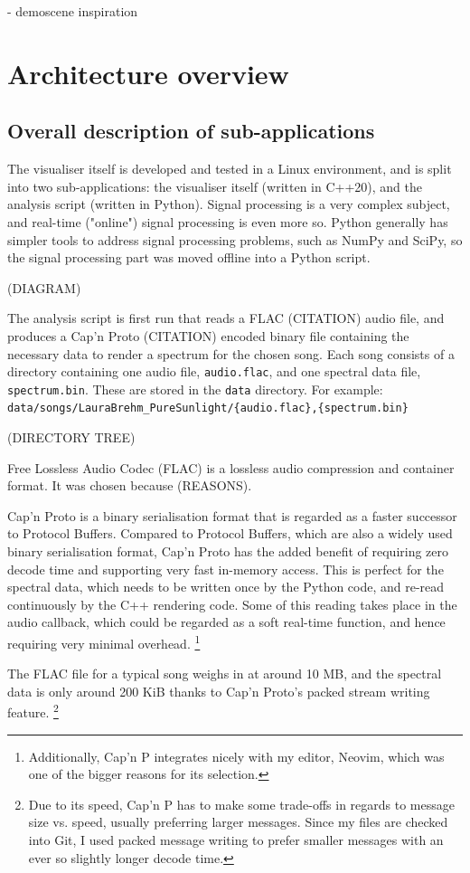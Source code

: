 \documentclass[11pt]{article}
\begin{document}
- demoscene inspiration

\section{Architecture overview}
\subsection{Overall description of sub-applications}
The visualiser itself is developed and tested in a Linux environment, and is split into two sub-applications:
the visualiser itself (written in C++20), and the analysis script (written in Python). Signal processing is a
very complex subject, and real-time ("online") signal processing is even more so. Python generally has simpler
tools to address signal processing problems, such as NumPy and SciPy, so the signal processing part was moved
offline into a Python script.

(DIAGRAM)

The analysis script is first run that reads a FLAC (CITATION) audio file, and produces a Cap'n Proto (CITATION)
encoded binary file containing the necessary data to render a spectrum for the chosen song. Each song consists
of a directory containing one audio file, \verb|audio.flac|, and one spectral data file, \verb|spectrum.bin|.
These are stored in the \verb|data| directory. For example: \\
\verb|data/songs/LauraBrehm_PureSunlight/{audio.flac},{spectrum.bin}|

(DIRECTORY TREE)

Free Lossless Audio Codec (FLAC) is a lossless audio compression and container format. It was chosen because
(REASONS).

Cap'n Proto is a binary serialisation format that is regarded as a faster successor to Protocol Buffers.
Compared to Protocol Buffers, which are also a widely used binary serialisation format, Cap'n Proto has the
added benefit of requiring zero decode time and supporting very fast in-memory access. This is perfect for the
spectral data, which needs to be written once by the Python code, and re-read continuously by the C++
rendering code. Some of this reading takes place in the audio callback, which could be regarded as a soft
real-time function, and hence requiring very minimal overhead.
\footnote{Additionally, Cap'n P integrates nicely with my editor, Neovim, which was one of the bigger reasons
for its selection.}

The FLAC file for a typical song weighs in at around 10 MB, and the spectral data is only around 200 KiB
thanks to Cap'n Proto's packed stream writing feature. \footnote{Due to its speed, Cap'n P has to make some
trade-offs in regards to message size vs. speed, usually preferring larger messages. Since my files are
checked into Git, I used packed message writing to prefer smaller messages with an ever so slightly longer
decode time.}
\end{document}
